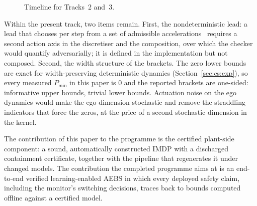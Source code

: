 \documentclass[11pt,a4paper]{article}
\theoremstyle{plain}
\theoremstyle{remark}
\begin{document}
	\begin{figure}[h]
		\centering
		\caption{Timeline for Tracks~2 and~3.}
		\label{fig:gantt}
	\end{figure}
	
	Within the present track, two items remain. First, the nondeterministic lead: a lead that chooses per step from a set of admissible accelerations~\cite{EuroNCAP} requires a second action axis in the discretiser and the composition, over which the checker would quantify adversarially; it is defined in the implementation but not composed. Second, the width structure of the brackets. The zero lower bounds are exact for width-preserving deterministic dynamics (Section~\ref{sec:cs:exp}), so every measured $P_{\min}$ in this paper is $0$ and the reported brackets are one-sided: informative upper bounds, trivial lower bounds. Actuation noise on the ego dynamics would make the ego dimension stochastic and remove the straddling indicators that force the zeros, at the price of a second stochastic dimension in the kernel.
	
	The contribution of this paper to the programme is the certified plant-side component: a sound, automatically constructed IMDP with a discharged containment certificate, together with the pipeline that regenerates it under changed models. The contribution the completed programme aims at is an end-to-end verified learning-enabled AEBS in which every deployed safety claim, including the monitor's switching decisions, traces back to bounds computed offline against a certified model.
	
\end{document}
